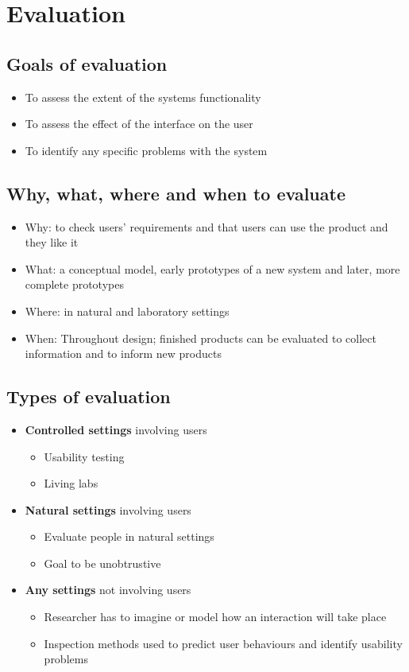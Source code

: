 \documentclass{article}[18pt]
\begin{document}
\section{Evaluation}
\subsection{Goals of evaluation}
\begin{itemize}
	\item To assess the extent of the systems functionality
	\item To assess the effect of the interface on the user
	\item To identify any specific problems with the system
\end{itemize}
\subsection{Why, what, where and when to evaluate}
\begin{itemize}
	\item Why: to check users' requirements and that users can use the product and they like it
	\item What: a conceptual model, early prototypes of a new system and later, more complete prototypes
	\item Where: in natural and laboratory settings
	\item When: Throughout design; finished products can be evaluated to collect information and to inform new products
\end{itemize}
\subsection{Types of evaluation}
\begin{itemize}
	\item \textbf{Controlled settings} involving users
	\begin{itemize}
		\item Usability testing
		\item Living labs
	\end{itemize}
	\item \textbf{Natural settings} involving users
	\begin{itemize}
		\item Evaluate people in natural settings
		\item Goal to be unobtrustive
	\end{itemize}
	\item \textbf{Any settings} not involving users
	\begin{itemize}
		\item Researcher has to imagine or model how an interaction will take place
		\item Inspection methods used to predict user behaviours and identify usability problems
	\end{itemize}
\end{itemize}
\end{document}
